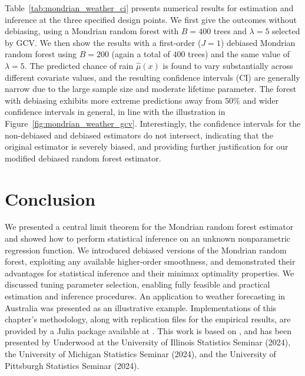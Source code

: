 Table~\ref{tab:mondrian_weather_ci} presents numerical results for estimation
and
inference at the three specified design points. We first give the outcomes
without debiasing, using a Mondrian random forest with $B = 400$ trees and
$\lambda = 5$ selected by GCV. We then show the results with a first-order
($J=1$) debiased Mondrian random forest using $B = 200$ (again a total of
$400$ trees) and the same value of $\lambda = 5$. The predicted chance of rain
$\hat\mu(x)$ is found to vary substantially across different covariate values,
and the resulting confidence intervals (CI) are generally narrow due to the
large sample size and moderate lifetime parameter. The forest with debiasing
exhibits more extreme predictions away from $50\%$ and wider confidence
intervals in general, in line with the illustration in
Figure~\ref{fig:mondrian_weather_gcv}. Interestingly, the confidence intervals
for the
non-debiased and debiased estimators do not intersect, indicating that the
original estimator is severely biased, and providing further justification for
our modified debiased random forest estimator.

\section{Conclusion}%
\label{sec:mondrian_conclusion}

We presented a central limit theorem for the Mondrian random forest estimator
and showed how to perform statistical inference on an unknown nonparametric
regression function. We introduced debiased versions of the Mondrian random
forest, exploiting any available higher-order smoothness, and demonstrated
their advantages
for statistical inference and their minimax optimality properties. We discussed
tuning parameter selection, enabling fully feasible and practical estimation
and inference procedures. An application to weather forecasting
in Australia was presented
as an illustrative example. Implementations of this chapter's methodology,
along with replication files for the empirical results, are provided by a Julia
package available at .
This work is based on \citet{cattaneo2023inference}, and has been
presented by Underwood at the University of Illinois Statistics Seminar (2024),
the University of Michigan Statistics Seminar (2024), and the University of
Pittsburgh Statistics Seminar (2024).
